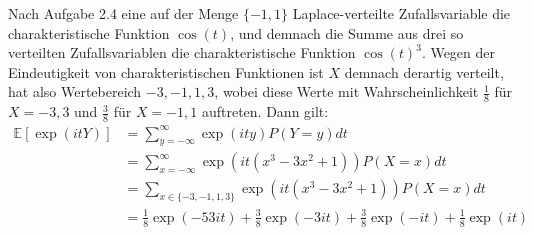 \documentclass[a4paper]{article}
\begin{document}
Nach Aufgabe 2.4 eine auf der Menge $\{-1,1\}$ Laplace-verteilte Zufallsvariable die charakteristische Funktion $\cos(t)$, und demnach die Summe aus drei so verteilten Zufallsvariablen die charakteristische Funktion $\cos(t)^3$. Wegen der Eindeutigkeit von charakteristischen Funktionen ist $X$ demnach derartig verteilt, hat also Wertebereich $-3, -1, 1, 3$, wobei diese Werte mit Wahrscheinlichkeit $\frac{1}{8}$ für $X=-3,3$ und $\frac{3}{8}$ für $X = -1,1$ auftreten. Dann gilt:
\begin{align*}
    \mathds{E}[\exp(itY)] &= \sum_{y=-\infty}^{\infty} \exp(ity) P(Y = y) dt \\
    &= \sum_{x=-\infty}^{\infty} \exp(it (x^3 - 3 x^2 + 1)) P(X = x) dt \\
    &= \sum_{x \in \{ -3, -1, 1, 3 \}} \exp(it (x^3 - 3 x^2 + 1)) P(X = x) dt \\
    &= \frac{1}{8} \exp(-53it)  + \frac{3}{8}\exp(-3it)  + \frac{3}{8}\exp(-it)  + \frac{1}{8}\exp(it)
\end{align*}
\end{document}
